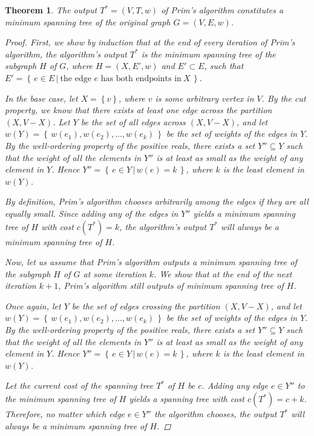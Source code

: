 \documentclass[a4paper,11pt]{report}
\theoremstyle{plain}
\newtheorem{thm}{Theorem}[section]
\theoremstyle{definition}
\begin{document}
\begin{thm}
The output $T^* = (V, T, w)$ of Prim's algorithm constitutes a minimum spanning
tree of the original graph $G = (V, E, w)$.

\begin{proof}
First, we show by induction that at the end of every iteration of Prim's
algorithm, the algorithm's output $T^*$ is the minimum spanning tree of the
subgraph $H$ of $G$, where $H = (X, E', w)$ and $E' \subset E$, such that
$E' = \left\{\,e\in E\,|\:\text{the edge $e$ has both endpoints in}\:X\,
\right\}$.


In the base case, let $X = \left\{v\right\}$, where $v$ is some arbitrary vertex in
$V$. By the cut property, we know that there exists at least one edge
across the partition $(X, V - X)$. Let $Y$ be the set of all edges across
$(X, V - X)$, and let $w(Y) = \left\{\,w(e_1), w(e_2), \ldots, w(e_k)\,\right\}$
be the set of weights of the edges in $Y$. By the well-ordering property
of the positive reals, there exists a set $Y'' \subseteq Y$ such that
the weight of all the elements in $Y''$ is at least as small as the weight
of any element in $Y$. Hence $Y'' = \left\{\,e \in Y\,|\, w(e) = k\,\right\}$,
where $k$ is the least element in $w(Y)$.

By definition, Prim's algorithm chooses arbitrarily among the edges if they
are all equally small. Since adding any of the edges in $Y''$ yields a
minimum spanning tree of $H$ with cost $c(T^*) = k$, the algorithm's output
$T^*$ will always be a minimum spanning tree of $H$.

Now, let us assume that Prim's algorithm outputs a minimum spanning tree of
the subgraph $H$ of $G$ at some iteration $k$. We show that at the end of the
next iteration $k + 1$, Prim's algorithm still outputs of minimum spanning tree
of $H$.

Once again, let $Y$ be the set of edges crossing the partition $(X, V - X)$,
and let $w(Y) = \left\{\,w(e_1), w(e_2), \ldots, w(e_k)\,\right\}$ be the set
of weights of the edges in $Y$. By the well-ordering property of the
positive reals, there exists a set $Y'' \subseteq Y$ such that the weight of
all the elements in $Y''$ is at least as small as the weight of any element
in $Y$. Hence $Y'' = \left\{\,e \in Y\,|\, w(e) = k\,\right\}$,
where $k$ is the least element in $w(Y)$.

Let the current cost of the spanning tree $T^*$ of $H$ be $c$. Adding any
edge $e \in Y''$ to the minimum spanning tree of $H$ yields a spanning tree
with cost $c(T^*) = c + k$. Therefore, no matter which edge $e \in Y''$ the
algorithm chooses, the output $T^*$ will always be a minimum spanning tree of
$H$.


\end{proof}
\end{thm}
\end{document}
